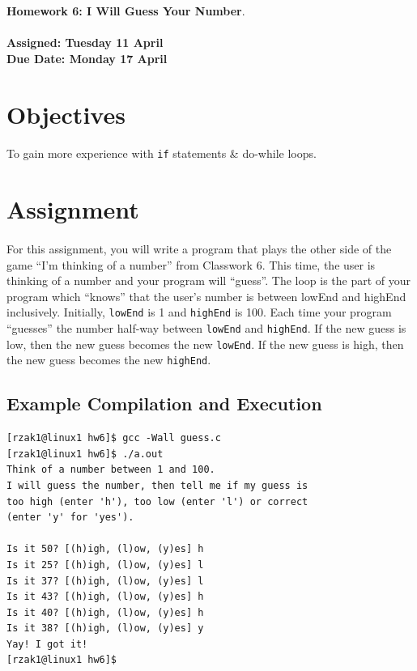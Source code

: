 \documentclass[letter,11pt]{article}
\begin{document}
\huge
\textbf{Homework 6: I Will Guess Your Number}.
\normalsize
\\ ~~ \\
\textbf{Assigned: Tuesday 11 April} \\
\textbf{Due Date: Monday 17 April}

\section*{Objectives}
\paragraph{}To gain more experience with \texttt{if} statements \& do-while loops.

\FloatBarrier
\section*{Assignment}
\paragraph{}For this assignment, you will write a program that plays the other side of the game ``I'm thinking of a number'' from Classwork 6. This time, the user is thinking of a number and your program will ``guess''. The loop is the part of your program which ``knows'' that the user's number is between lowEnd and highEnd inclusively. Initially, \texttt{lowEnd} is 1 and \texttt{highEnd} is 100. Each time your program ``guesses'' the number half-way between \texttt{lowEnd} and \texttt{highEnd}. If the new guess is low, then the new guess becomes the new \texttt{lowEnd}. If the new guess is high, then the new guess becomes the new \texttt{highEnd}.

\subsection*{Example Compilation and Execution}
\begin{verbatim}
[rzak1@linux1 hw6]$ gcc -Wall guess.c
[rzak1@linux1 hw6]$ ./a.out
Think of a number between 1 and 100.
I will guess the number, then tell me if my guess is
too high (enter 'h'), too low (enter 'l') or correct
(enter 'y' for 'yes').

Is it 50? [(h)igh, (l)ow, (y)es] h
Is it 25? [(h)igh, (l)ow, (y)es] l
Is it 37? [(h)igh, (l)ow, (y)es] l
Is it 43? [(h)igh, (l)ow, (y)es] h
Is it 40? [(h)igh, (l)ow, (y)es] h
Is it 38? [(h)igh, (l)ow, (y)es] y
Yay! I got it!
[rzak1@linux1 hw6]$ 
\end{verbatim}
\end{document}
